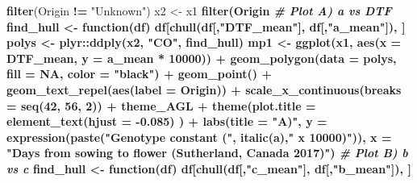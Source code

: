\documentclass[
]{article}
\newenvironment{Shaded}{\begin{snugshade}}{\end{snugshade}}
\newcommand{\CommentTok}[1]{\textcolor[rgb]{0.56,0.35,0.01}{\textit{#1}}}
\newcommand{\ControlFlowTok}[1]{\textcolor[rgb]{0.13,0.29,0.53}{\textbf{#1}}}
\newcommand{\DataTypeTok}[1]{\textcolor[rgb]{0.13,0.29,0.53}{#1}}
\newcommand{\DecValTok}[1]{\textcolor[rgb]{0.00,0.00,0.81}{#1}}
\newcommand{\FloatTok}[1]{\textcolor[rgb]{0.00,0.00,0.81}{#1}}
\newcommand{\KeywordTok}[1]{\textcolor[rgb]{0.13,0.29,0.53}{\textbf{#1}}}
\newcommand{\NormalTok}[1]{#1}
\newcommand{\OperatorTok}[1]{\textcolor[rgb]{0.81,0.36,0.00}{\textbf{#1}}}
\newcommand{\OtherTok}[1]{\textcolor[rgb]{0.56,0.35,0.01}{#1}}
\newcommand{\StringTok}[1]{\textcolor[rgb]{0.31,0.60,0.02}{#1}}
\begin{document}
\begin{Shaded}
\begin{Highlighting}[]
{{{{{{{{{{\StringTok{  }\KeywordTok{filter}\NormalTok{(Origin }\OperatorTok{!=}\StringTok{ "Unknown"}\NormalTok{)}
\NormalTok{x2 <-}\StringTok{ }\NormalTok{x1 }\OperatorTok{%
\StringTok{  }\KeywordTok{filter}\NormalTok{(Origin }\OperatorTok{%
\CommentTok{# Plot A) a vs DTF}
\NormalTok{find_hull <-}\StringTok{ }\ControlFlowTok{function}\NormalTok{(df) df[}\KeywordTok{chull}\NormalTok{(df[,}\StringTok{"DTF_mean"}\NormalTok{], df[,}\StringTok{"a_mean"}\NormalTok{]), ]}
\NormalTok{polys <-}\StringTok{ }\NormalTok{plyr}\OperatorTok{::}\KeywordTok{ddply}\NormalTok{(x2, }\StringTok{"CO"}\NormalTok{, find_hull)}
\NormalTok{mp1 <-}\StringTok{ }\KeywordTok{ggplot}\NormalTok{(x1, }\KeywordTok{aes}\NormalTok{(}\DataTypeTok{x =}\NormalTok{ DTF_mean, }\DataTypeTok{y =}\NormalTok{ a_mean }\OperatorTok{*}\StringTok{ }\DecValTok{10000}\NormalTok{)) }\OperatorTok{+}\StringTok{ }
\StringTok{  }\KeywordTok{geom_polygon}\NormalTok{(}\DataTypeTok{data =}\NormalTok{ polys, }\DataTypeTok{fill =} \OtherTok{NA}\NormalTok{, }\DataTypeTok{color =} \StringTok{"black"}\NormalTok{) }\OperatorTok{+}
\StringTok{  }\KeywordTok{geom_point}\NormalTok{() }\OperatorTok{+}\StringTok{ }\KeywordTok{geom_text_repel}\NormalTok{(}\KeywordTok{aes}\NormalTok{(}\DataTypeTok{label =}\NormalTok{ Origin)) }\OperatorTok{+}
\StringTok{  }\KeywordTok{scale_x_continuous}\NormalTok{(}\DataTypeTok{breaks =} \KeywordTok{seq}\NormalTok{(}\DecValTok{42}\NormalTok{, }\DecValTok{56}\NormalTok{, }\DecValTok{2}\NormalTok{)) }\OperatorTok{+}\StringTok{ }
\StringTok{  }\NormalTok{theme_AGL }\OperatorTok{+}
\StringTok{  }\KeywordTok{theme}\NormalTok{(}\DataTypeTok{plot.title =} \KeywordTok{element_text}\NormalTok{(}\DataTypeTok{hjust =} \FloatTok{-0.085}\NormalTok{) ) }\OperatorTok{+}
\StringTok{  }\KeywordTok{labs}\NormalTok{(}\DataTypeTok{title =} \StringTok{"A)"}\NormalTok{,}
       \DataTypeTok{y =} \KeywordTok{expression}\NormalTok{(}\KeywordTok{paste}\NormalTok{(}\StringTok{"Genotype constant ("}\NormalTok{, }\KeywordTok{italic}\NormalTok{(a),}\StringTok{" x 10000)"}\NormalTok{)), }
       \DataTypeTok{x =} \StringTok{"Days from sowing to flower (Sutherland, Canada 2017)"}\NormalTok{)}
\CommentTok{# Plot B) b vs c}
\NormalTok{find_hull <-}\StringTok{ }\ControlFlowTok{function}\NormalTok{(df) df[}\KeywordTok{chull}\NormalTok{(df[,}\StringTok{"c_mean"}\NormalTok{], df[,}\StringTok{"b_mean"}\NormalTok{]), ]}
}}}}}}}}}}}}
\end{Highlighting}
\end{Shaded}
\end{document}
